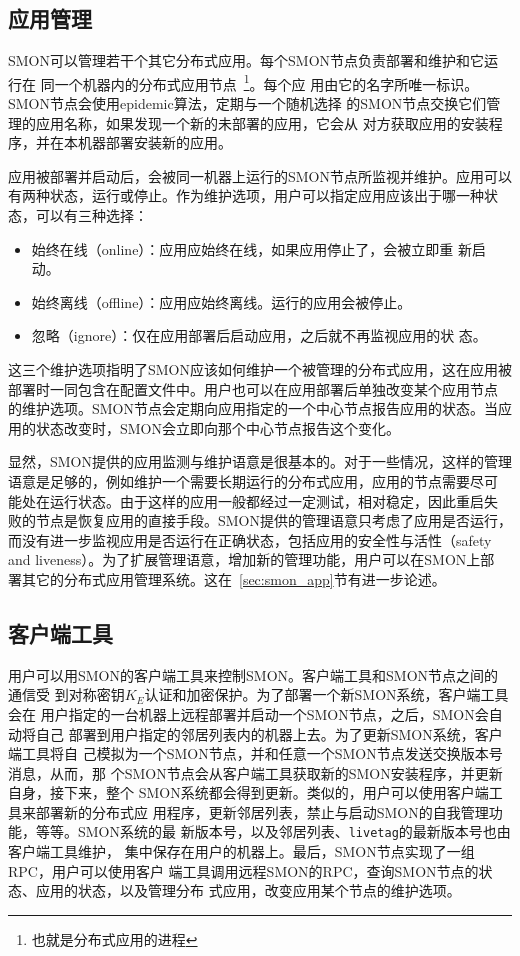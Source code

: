\subsection{应用管理}

SMON可以管理若干个其它分布式应用。每个SMON节点负责部署和维护和它运行在
同一个机器内的分布式应用节点~\footnote{也就是分布式应用的进程}。每个应
用由它的名字所唯一标识。SMON节点会使用epidemic算法，定期与一个随机选择
的SMON节点交换它们管理的应用名称，如果发现一个新的未部署的应用，它会从
对方获取应用的安装程序，并在本机器部署安装新的应用。

应用被部署并启动后，会被同一机器上运行的SMON节点所监视并维护。应用可以
有两种状态，运行或停止。作为维护选项，用户可以指定应用应该出于哪一种状
态，可以有三种选择：

\begin{itemize}
  \item 始终在线（online）：应用应始终在线，如果应用停止了，会被立即重
  新启动。

  \item 始终离线（offline）：应用应始终离线。运行的应用会被停止。

  \item 忽略（ignore）：仅在应用部署后启动应用，之后就不再监视应用的状
  态。
\end{itemize}

这三个维护选项指明了SMON应该如何维护一个被管理的分布式应用，这在应用被
部署时一同包含在配置文件中。用户也可以在应用部署后单独改变某个应用节点
的维护选项。SMON节点会定期向应用指定的一个中心节点报告应用的状态。当应
用的状态改变时，SMON会立即向那个中心节点报告这个变化。

显然，SMON提供的应用监测与维护语意是很基本的。对于一些情况，这样的管理
语意是足够的，例如维护一个需要长期运行的分布式应用，应用的节点需要尽可
能处在运行状态。由于这样的应用一般都经过一定测试，相对稳定，因此重启失
败的节点是恢复应用的直接手段。SMON提供的管理语意只考虑了应用是否运行，
而没有进一步监视应用是否运行在正确状态，包括应用的安全性与活性（safety
and liveness）。为了扩展管理语意，增加新的管理功能，用户可以在SMON上部
署其它的分布式应用管理系统。这在~\ref{sec:smon_app}节有进一步论述。

\subsection{客户端工具}
\label{subsec:client}

用户可以用SMON的客户端工具来控制SMON。客户端工具和SMON节点之间的通信受
到对称密钥$K_E$认证和加密保护。为了部署一个新SMON系统，客户端工具会在
用户指定的一台机器上远程部署并启动一个SMON节点，之后，SMON会自动将自己
部署到用户指定的邻居列表内的机器上去。为了更新SMON系统，客户端工具将自
己模拟为一个SMON节点，并和任意一个SMON节点发送交换版本号消息，从而，那
个SMON节点会从客户端工具获取新的SMON安装程序，并更新自身，接下来，整个
SMON系统都会得到更新。类似的，用户可以使用客户端工具来部署新的分布式应
用程序，更新邻居列表，禁止与启动SMON的自我管理功能，等等。SMON系统的最
新版本号，以及邻居列表、\texttt{livetag}的最新版本号也由客户端工具维护，
集中保存在用户的机器上。最后，SMON节点实现了一组RPC，用户可以使用客户
端工具调用远程SMON的RPC，查询SMON节点的状态、应用的状态，以及管理分布
式应用，改变应用某个节点的维护选项。

